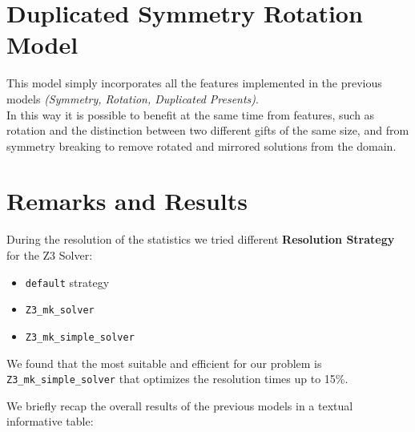 

\section{Duplicated Symmetry Rotation Model}

This model simply incorporates all the features implemented in the previous models \textit{(Symmetry, Rotation, Duplicated Presents)}.
\\
In this way it is possible to benefit at the same time from features, such as rotation and the distinction between two different gifts of the same size,
and from symmetry breaking to remove rotated and mirrored solutions from the domain.  




\section{Remarks and Results}
During the resolution of the statistics we tried different \textbf{Resolution Strategy} for the Z3 Solver:
\begin{itemize}
	\item \texttt{default} strategy
	\item \texttt{Z3\_mk\_solver}
	\item \texttt{Z3\_mk\_simple\_solver}
\end{itemize}
We found that the most suitable and efficient for our problem is \texttt{Z3\_mk\_simple\_solver} that optimizes the resolution times up to 15\%.

We briefly recap the overall results of the previous models in a textual informative table:

